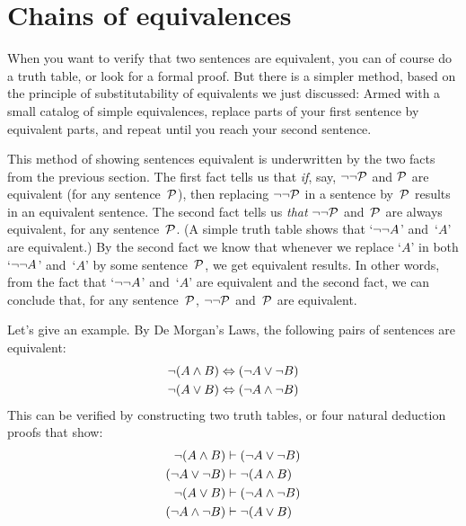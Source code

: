 \section{Chains of equivalences}

When you want to verify that two sentences are equivalent, you can of course do a truth table, or look for a formal proof.  But there is a simpler method, based on the principle of substitutability of equivalents we just discussed: Armed with a small catalog of simple equivalences, replace parts of your first sentence by equivalent parts, and repeat until you reach your second sentence.

This method of showing sentences equivalent is underwritten by the two facts from the previous section. The first fact tells us that \emph{if}, say, $\neg\neg \mathcal{P}$ and $\mathcal{P}$ are equivalent (for any sentence~$\mathcal{P}$), then replacing $\neg\neg\mathcal{P}$ in a sentence by~$\mathcal{P}$ results in an equivalent sentence. The second fact tells us \emph{that} $\neg\neg \mathcal{P}$ and~$\mathcal{P}$ are always equivalent, for any sentence~$\mathcal{P}$. (A simple truth table shows that `$\neg\neg A$' and~`$A$' are equivalent.) By the second fact we know that whenever we replace `$A$' in both `$\neg\neg A$' and~`$A$' by some sentence~$\mathcal{P}$, we get equivalent results. In other words, from the fact that `$\neg\neg A$' and~`$A$' are equivalent and the second fact, we can conclude that, for any sentence~$\mathcal{P}$, $\neg\neg \mathcal{P}$ and~$\mathcal{P}$ are equivalent.

Let's give an example. By De Morgan's Laws, the following pairs of sentences are equivalent:
\begin{align*}
	\neg (A \wedge B) & \Leftrightarrow (\neg A \vee \neg B)\\
	\neg (A \vee B) & \Leftrightarrow (\neg A \wedge \neg B)
\end{align*}
This can be verified by constructing two truth tables, or four natural deduction proofs that show:
\begin{align*}
	\neg (A \wedge B) & \vdash (\neg A \vee \neg B)\\
	(\neg A \vee \neg B) & \vdash \neg (A \wedge B)\\
	\neg (A \vee B) & \vdash (\neg A \wedge \neg B)\\
	(\neg A \wedge \neg B) & \vdash \neg (A \vee B)
\end{align*}

